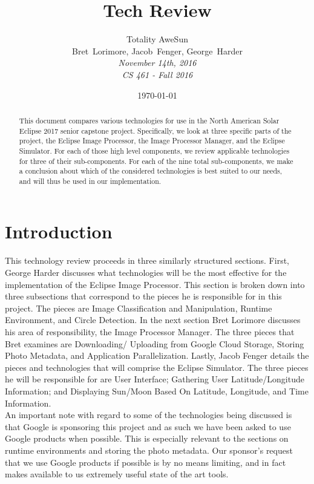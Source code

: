 \documentclass[10pt, onecolumn, draftclsnofoot, letterpaper, compsoc]{IEEEtran}
\title{Tech Review}
\date{\today} %
\author{Totality AweSun \\
		Bret~Lorimore, Jacob~Fenger, George~Harder \\
		\textit{November 14th, 2016 \\
		CS 461 - Fall 2016}}
\begin{document}
\maketitle

\begin{abstract}

This document compares various technologies for use in the North American Solar
Eclipse 2017 senior capstone project. Specifically, we look at three specific parts
of the project, the Eclipse Image Processor, the Image Processor Manager, and the
Eclipse Simulator. For each of those high level components, we review applicable
technologies for three of their sub-components. For each of the nine total sub-components,
we make a conclusion about which of the considered technologies is best suited to our
needs, and will thus be used in our implementation.

\end{abstract}

\newpage

\section{Introduction}

This technology review proceeds in three similarly structured sections. First,
George Harder discusses what technologies will be the most effective for the
implementation of the Eclipse Image Processor. This section is broken down into
three subsections that correspond to the pieces he is responsible for in this
project. The pieces are Image Classification and Manipulation, Runtime
Environment, and Circle Detection. In the next section Bret Lorimore discusses
his area of responsibility, the Image Processor Manager. The three pieces that
Bret examines are Downloading/ Uploading from Google Cloud Storage, Storing
Photo Metadata, and Application Parallelization. Lastly, Jacob Fenger details
the pieces and technologies that will comprise the Eclipse Simulator. The three
pieces he will be responsible for are User Interface; Gathering User
Latitude/Longitude Information; and Displaying Sun/Moon Based On Latitude,
Longitude, and Time Information. \\

An important note with regard to some of the technologies being discussed is
that Google is sponsoring this project and as such we have been asked to use
Google products when possible. This is especially relevant to the sections on
runtime environments and storing the photo metadata. Our sponsor's request that
we use Google products if possible is by no means limiting, and in fact makes
available to us extremely useful state of the art tools. \\
\end{document}
